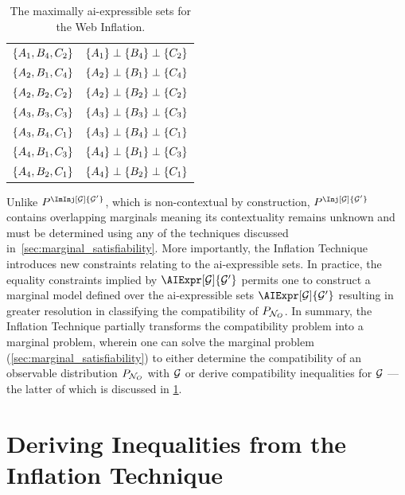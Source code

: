\documentclass[aps, 10pt, english, twoside, pra, nofootinbib, tightenlines, longbibliography, superscriptaddress]{revtex4-1}
\begin{document}
\begin{nscenter}
\begin{table}
{\begin{tabular}{|c|c|}
                $\bc{A_1, B_4, C_2}$ & $\bc{A_1} \ancestralindep \bc{B_4} \ancestralindep \bc{C_2}$ \\
                $\bc{A_2, B_1, C_4}$ & $\bc{A_2} \ancestralindep \bc{B_1} \ancestralindep \bc{C_4}$ \\
                $\bc{A_2, B_2, C_2}$ & $\bc{A_2} \ancestralindep \bc{B_2} \ancestralindep \bc{C_2}$ \\
                $\bc{A_3, B_3, C_3}$ & $\bc{A_3} \ancestralindep \bc{B_3} \ancestralindep \bc{C_3}$ \\
                $\bc{A_3, B_4, C_1}$ & $\bc{A_3} \ancestralindep \bc{B_4} \ancestralindep \bc{C_1}$ \\
                $\bc{A_4, B_1, C_3}$ & $\bc{A_4} \ancestralindep \bc{B_1} \ancestralindep \bc{C_3}$ \\
                $\bc{A_4, B_2, C_1}$ & $\bc{A_4} \ancestralindep \bc{B_2} \ancestralindep \bc{C_1}$ \\
                \hline
            \end{tabular}
            \caption{The maximally ai-expressible sets for the Web Inflation.
            \label{tab:asexpr_triangle_structure_web}}
        }
        \end{table}
    \end{nscenter}

    Unlike $\prob^{\ImInj[\graph]{\graph'}}$, which is non-contextual by construction, $\prob^{\Inj[\graph]{\graph'}}$ contains overlapping marginals meaning its contextuality remains unknown and must be determined using any of the techniques discussed in~\cref{sec:marginal_satisfiability}. More importantly, the Inflation Technique introduces new constraints relating to the ai-expressible sets. In practice, the equality constraints implied by $\AIExpr[\graph]{\graph'}$ permits one to construct a marginal model defined over the ai-expressible sets $\AIExpr[\graph]{\graph'}$ resulting in greater resolution in classifying the compatibility of $\prob[\nodes_O]$. In summary, the Inflation Technique partially transforms the compatibility problem into a marginal problem, wherein one can solve the marginal problem (\cref{sec:marginal_satisfiability}) to either determine the compatibility of an observable distribution $\prob[\nodes_O]$ with $\mathcal{G}$ or derive compatibility inequalities for $\mathcal{G}$ --- the latter of which is discussed in \cref{sec:deriving_inequalities}.

    \section{Deriving Inequalities from the Inflation Technique}
    \label{sec:deriving_inequalities}
\end{document}
